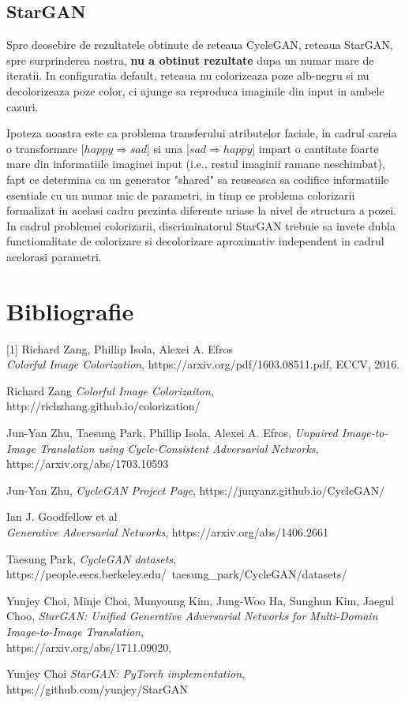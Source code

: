 \documentclass[12pt]{article}
\theoremstyle{definition}
\begin{document}
\subsection{StarGAN}

Spre deosebire de rezultatele obtinute de reteaua CycleGAN, reteaua StarGAN, spre surprinderea nostra, \textbf{nu a obtinut rezultate} dupa un numar mare de iteratii. In configuratia default, reteaua nu colorizeaza poze alb-negru si nu decolorizeaza poze color, ci ajunge sa reproduca imaginile din input in ambele cazuri.

Ipoteza noastra este ca problema transferului atributelor faciale, in cadrul careia o transformare [$happy \Rightarrow sad$] si una [$sad \Rightarrow happy$] impart o cantitate foarte mare din informatiile imaginei input (i.e., restul imaginii ramane neschimbat), fapt ce determina ca un generator "shared" sa reuseasca sa codifice informatiile esentiale cu un numar mic de parametri, in timp ce problema colorizarii formalizat in acelasi cadru prezinta diferente uriase la nivel de structura a pozei. In cadrul problemei colorizarii, discriminatorul StarGAN trebuie sa invete dubla functionalitate de colorizare si decolorizare aproximativ independent in cadrul acelorasi parametri.

\section{Bibliografie}

[1] Richard Zang, Phillip Isola, Alexei A. Efros \\ \textit {Colorful Image Colorization}, https://arxiv.org/pdf/1603.08511.pdf, ECCV, 2016. \par
[2] Richard Zang \textit {Colorful Image Colorizaiton}, http://richzhang.github.io/colorization/ \par
[3] Jun-Yan Zhu, Taesung Park, Phillip Isola, Alexei A. Efros, \textit {Unpaired Image-to-Image Translation using Cycle-Consistent Adversarial Networks}, https://arxiv.org/abs/1703.10593 \par
[4] Jun-Yan Zhu, \textit{CycleGAN Project Page}, https://junyanz.github.io/CycleGAN/ \par
[5] Ian J. Goodfellow et al \\ \textit{Generative Adversarial Networks}, https://arxiv.org/abs/1406.2661 \par
[6] Taesung Park, \textit{CycleGAN datasets}, \\ https://people.eecs.berkeley.edu/~taesung\_park/CycleGAN/datasets/ \par
[7] Yunjey Choi, Minje Choi, Munyoung Kim, Jung-Woo Ha, Sunghun Kim, Jaegul Choo, \textit{StarGAN: Unified Generative Adversarial Networks for Multi-Domain Image-to-Image Translation}, \\
https://arxiv.org/abs/1711.09020, \par
[8] Yunjey Choi \textit{StarGAN: PyTorch implementation}, \\
https://github.com/yunjey/StarGAN
\end{document}
